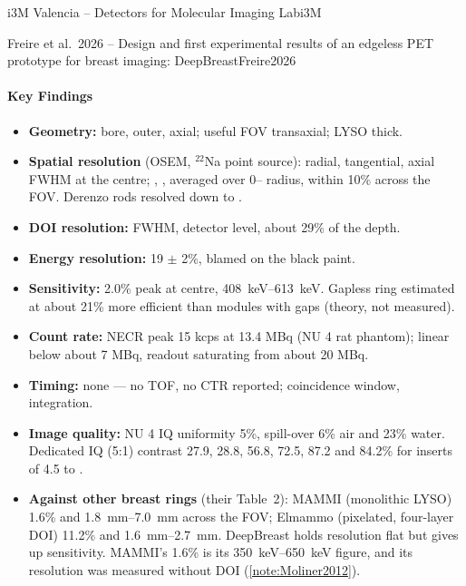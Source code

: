 \begin{programnote}{i3M Valencia -- Detectors for Molecular Imaging Lab}{i3M}
\begin{papernote}{Freire et al.\ 2026 -- Design and first experimental results of an edgeless PET prototype for breast imaging: DeepBreast}{Freire2026}
\paragraph{Key Findings}
\begin{itemize}
	\item \textbf{Geometry:}  bore,  outer,  axial;
		useful FOV  transaxial; LYSO  thick.
	\item \textbf{Spatial resolution} (OSEM, $^{22}$Na point source):
		 radial,  tangential,  axial FWHM at the
		centre; , ,  averaged
		over 0-- radius, within 10\% across the FOV. Derenzo rods
		resolved down to .
	\item \textbf{DOI resolution:}  FWHM, detector level,
		about 29\% of the  depth.
	\item \textbf{Energy resolution:} 19 $\pm$ 2\%, blamed on the black
		paint.
	\item \textbf{Sensitivity:} 2.0\% peak at centre,
		\qtyrange{408}{613}{\kilo\electronvolt}. Gapless ring estimated at
		about 21\% more efficient than modules with  gaps (theory, not
		measured).
	\item \textbf{Count rate:} NECR peak 15 kcps at 13.4 MBq (NU 4 rat
		phantom); linear below about 7 MBq, readout saturating from about
		20 MBq.
	\item \textbf{Timing:} none --- no TOF, no CTR reported; 
		coincidence window,  integration.
	\item \textbf{Image quality:} NU 4 IQ uniformity 5\%, spill-over 6\% air
		and 23\% water. Dedicated IQ (5:1) contrast 27.9, 28.8, 56.8, 72.5,
		87.2 and 84.2\% for inserts of 4.5 to .
	\item \textbf{Against other breast rings} (their Table~2): MAMMI
		(monolithic LYSO) 1.6\% and \qtyrange{1.8}{7.0}{\milli\metre} across
		the FOV; Elmammo (pixelated, four-layer DOI) 11.2\% and
		\qtyrange{1.6}{2.7}{\milli\metre}. DeepBreast holds resolution flat
		but gives up sensitivity. MAMMI's 1.6\% is its
		\qtyrange{350}{650}{\kilo\electronvolt} figure, and its resolution
		was measured without DOI (\ref{note:Moliner2012}).
\end{itemize}


\end{papernote}
\end{programnote}
